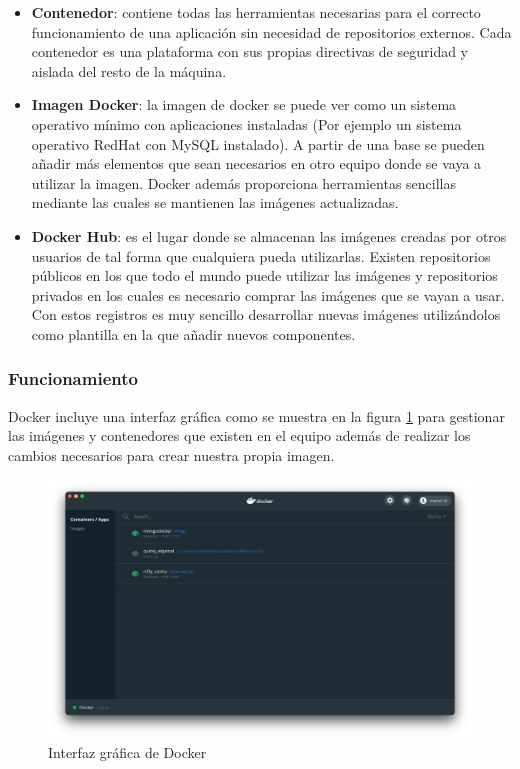 \begin{itemize}
    \item \textbf{Contenedor}: contiene todas las herramientas necesarias para el correcto funcionamiento de una aplicación sin necesidad de repositorios externos. Cada contenedor es una plataforma con sus propias directivas de seguridad y aislada del resto de la máquina.
    \item \textbf{Imagen Docker}: la imagen de docker se puede ver como un sistema operativo mínimo con aplicaciones instaladas (Por ejemplo un sistema operativo RedHat con MySQL instalado). A partir de una base se pueden añadir más elementos que sean necesarios en otro equipo donde se vaya a utilizar la imagen. Docker además proporciona herramientas sencillas mediante las cuales se mantienen las imágenes actualizadas.
    \item \textbf{Docker Hub}: es el lugar donde se almacenan las imágenes creadas por otros usuarios de tal forma que cualquiera pueda utilizarlas. Existen repositorios públicos en los que todo el mundo puede utilizar las imágenes y repositorios privados en los cuales es necesario comprar las imágenes que se vayan a usar. Con estos registros es muy sencillo desarrollar nuevas imágenes utilizándolos como plantilla en la que añadir nuevos componentes.
\end{itemize}

\subsubsection{Funcionamiento}

Docker incluye una interfaz gráfica como se muestra en la figura \ref{fig:dockerUI} para gestionar las imágenes y contenedores que existen en el equipo además de realizar los cambios necesarios para crear nuestra propia imagen.

\begin{figure}[H]
    \centering
    \includegraphics[scale=0.3]{include/capturas/DockerUI.png}
    \caption{Interfaz gráfica de Docker}
    \label{fig:dockerUI}
\end{figure}

